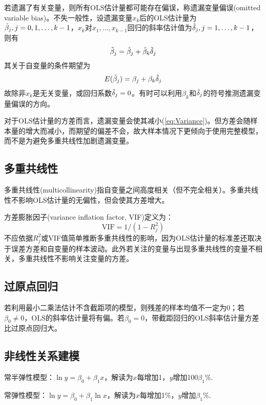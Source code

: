 \par 若遗漏了有关变量，则所有OLS估计量都可能存在偏误，称遗漏变量偏误(omitted variable bias)。不失一般性，设遗漏变量$x_k$后的OLS估计量为$\Tilde{\beta}_j,j=0,1,\dots,k-1$，$x_k$对$x_1,\dots,x_{k-1}$回归的斜率估计值为$\Tilde{\delta}_j,j=1,\dots,k-1$，则有
\begin{equation}
    \Tilde{\beta}_j=\hat{\beta}_j+\hat{\beta}_k\Tilde{\delta}_j
\end{equation}
其关于自变量的条件期望为
\begin{equation}
    E(\Tilde{\beta}_j)=\beta_j+\beta_k\Tilde{\delta}_j
\end{equation}
故除非$x_k$是无关变量，或回归系数$\Tilde{\delta}_j=0$。有时可以利用$\beta_k$和$\Tilde{\delta}_j$的符号推测遗漏变量偏误的方向。
\par 对于OLS估计量的方差而言，遗漏变量会使其减小(\ref{eq:Variance})。但方差会随样本量的增大而减小，而期望的偏差不会，故大样本情况下更倾向于使用完整模型，而不是为避免多重共线性加剧遗漏变量。

\subsection{多重共线性}

\par 多重共线性(multicollinearity)指自变量之间高度相关（但不完全相关）。多重共线性不影响OLS估计量的无偏性，但会使其方差增大。
\par 方差膨胀因子(variance inflation factor, VIF)定义为：
\begin{equation}
    \text{VIF}=1/(1-R_j^2)
\end{equation}
不应依据$R^2_j$或VIF值简单推断多重共线性的影响，因为OLS估计量的标准差还取决于误差方差和自变量的样本波动。此外若关注的变量与出现多重共线性的变量不相关，多重共线性不影响关注变量的方差。

\subsection{过原点回归}
\par 若利用最小二乘法估计不含截距项的模型，则残差的样本均值不一定为0；若$\beta_0\neq 0$，OLS的斜率估计量将有偏。若$\beta_0=0$，带截距回归的OLS斜率估计量方差比过原点回归大。

\subsection{非线性关系建模}
\par 常半弹性模型：$\ln y=\beta_0+\beta_1 x$，解读为$x$每增加1，$y$增加100$\beta_1$\%.
\par 常弹性模型：$\ln y=\beta_0+\beta_1 \ln x$，解读为$x$每增加1\%，$y$增加$\beta_1$\%.
